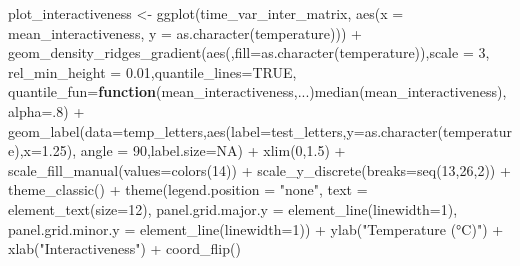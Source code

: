 \documentclass[
  letterpaper,
  DIV=11,
  numbers=noendperiod]{scrreprt}
\newenvironment{Shaded}{\begin{snugshade}}{\end{snugshade}}
\newcommand{\AttributeTok}[1]{\textcolor[rgb]{0.40,0.45,0.13}{#1}}
\newcommand{\ConstantTok}[1]{\textcolor[rgb]{0.56,0.35,0.01}{#1}}
\newcommand{\ControlFlowTok}[1]{\textcolor[rgb]{0.00,0.23,0.31}{\textbf{#1}}}
\newcommand{\DecValTok}[1]{\textcolor[rgb]{0.68,0.00,0.00}{#1}}
\newcommand{\FloatTok}[1]{\textcolor[rgb]{0.68,0.00,0.00}{#1}}
\newcommand{\FunctionTok}[1]{\textcolor[rgb]{0.28,0.35,0.67}{#1}}
\newcommand{\NormalTok}[1]{\textcolor[rgb]{0.00,0.23,0.31}{#1}}
\newcommand{\OtherTok}[1]{\textcolor[rgb]{0.00,0.23,0.31}{#1}}
\newcommand{\SpecialCharTok}[1]{\textcolor[rgb]{0.37,0.37,0.37}{#1}}
\newcommand{\StringTok}[1]{\textcolor[rgb]{0.13,0.47,0.30}{#1}}
\begin{document}
\begin{Shaded}
\begin{Highlighting}[]
\NormalTok{plot\_interactiveness }\OtherTok{\textless{}{-}} \FunctionTok{ggplot}\NormalTok{(time\_var\_inter\_matrix, }\FunctionTok{aes}\NormalTok{(}\AttributeTok{x =}\NormalTok{ mean\_interactiveness, }\AttributeTok{y =} \FunctionTok{as.character}\NormalTok{(temperature))) }\SpecialCharTok{+}
  \FunctionTok{geom\_density\_ridges\_gradient}\NormalTok{(}\FunctionTok{aes}\NormalTok{(,}\AttributeTok{fill=}\FunctionTok{as.character}\NormalTok{(temperature)),}\AttributeTok{scale =} \DecValTok{3}\NormalTok{, }\AttributeTok{rel\_min\_height =} \FloatTok{0.01}\NormalTok{,}\AttributeTok{quantile\_lines=}\ConstantTok{TRUE}\NormalTok{, }\AttributeTok{quantile\_fun=}\ControlFlowTok{function}\NormalTok{(mean\_interactiveness,...)}\FunctionTok{median}\NormalTok{(mean\_interactiveness),}\AttributeTok{alpha=}\NormalTok{.}\DecValTok{8}\NormalTok{) }\SpecialCharTok{+}
  \FunctionTok{geom\_label}\NormalTok{(}\AttributeTok{data=}\NormalTok{temp\_letters,}\FunctionTok{aes}\NormalTok{(}\AttributeTok{label=}\NormalTok{test\_letters,}\AttributeTok{y=}\FunctionTok{as.character}\NormalTok{(temperature),}\AttributeTok{x=}\FloatTok{1.25}\NormalTok{), }\AttributeTok{angle =} \DecValTok{90}\NormalTok{,}\AttributeTok{label.size=}\ConstantTok{NA}\NormalTok{) }\SpecialCharTok{+}
  \FunctionTok{xlim}\NormalTok{(}\DecValTok{0}\NormalTok{,}\FloatTok{1.5}\NormalTok{) }\SpecialCharTok{+}
  \FunctionTok{scale\_fill\_manual}\NormalTok{(}\AttributeTok{values=}\FunctionTok{colors}\NormalTok{(}\DecValTok{14}\NormalTok{)) }\SpecialCharTok{+}
  \FunctionTok{scale\_y\_discrete}\NormalTok{(}\AttributeTok{breaks=}\FunctionTok{seq}\NormalTok{(}\DecValTok{13}\NormalTok{,}\DecValTok{26}\NormalTok{,}\DecValTok{2}\NormalTok{)) }\SpecialCharTok{+}
  \FunctionTok{theme\_classic}\NormalTok{() }\SpecialCharTok{+}
  \FunctionTok{theme}\NormalTok{(}\AttributeTok{legend.position =} \StringTok{"none"}\NormalTok{,}
        \AttributeTok{text =} \FunctionTok{element\_text}\NormalTok{(}\AttributeTok{size=}\DecValTok{12}\NormalTok{),}
        \AttributeTok{panel.grid.major.y =} \FunctionTok{element\_line}\NormalTok{(}\AttributeTok{linewidth=}\DecValTok{1}\NormalTok{),}
        \AttributeTok{panel.grid.minor.y =} \FunctionTok{element\_line}\NormalTok{(}\AttributeTok{linewidth=}\DecValTok{1}\NormalTok{)) }\SpecialCharTok{+}
  \FunctionTok{ylab}\NormalTok{(}\StringTok{"Temperature (°C)"}\NormalTok{) }\SpecialCharTok{+} \FunctionTok{xlab}\NormalTok{(}\StringTok{"Interactiveness"}\NormalTok{) }\SpecialCharTok{+} \FunctionTok{coord\_flip}\NormalTok{()}


\end{Highlighting}
\end{Shaded}
\end{document}
